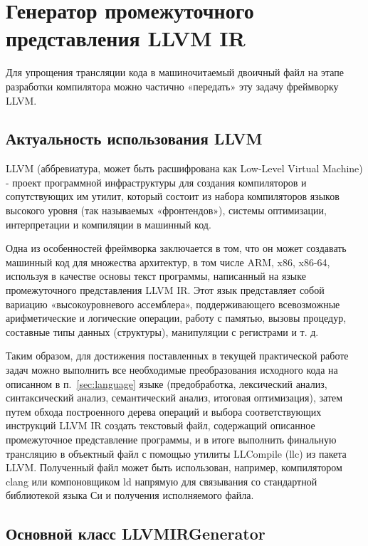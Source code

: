 \newpage
\section{Генератор промежуточного представления LLVM IR}
\label{sec:llvmir_codegen}

Для упрощения трансляции кода в машиночитаемый двоичный файл на этапе разработки компилятора можно частично «передать» эту задачу фреймворку LLVM.

\subsection{Актуальность использования LLVM}

LLVM (аббревиатура, может быть расшифрована как Low-Level Virtual Machine) - проект программной инфраструктуры для создания компиляторов и сопутствующих им утилит, который состоит из набора компиляторов языков высокого уровня (так называемых «фронтендов»), системы оптимизации, интерпретации и компиляции в машинный код.

Одна из особенностей фреймворка заключается в том, что он может создавать машинный код для множества архитектур, в том числе ARM, x86, x86-64, используя в качестве основы текст программы, написанный на языке промежуточного представления LLVM IR.
Этот язык представляет собой вариацию «высокоуровневого ассемблера», поддерживающего всевозможные арифметические и логические операции, работу с памятью, вызовы процедур, составные типы данных (структуры), манипуляции с регистрами и т. д.

Таким образом, для достижения поставленных в текущей практической работе задач можно выполнить все необходимые преобразования исходного кода на описанном в п.~\ref{sec:language} языке (предобработка, лексический анализ, синтаксический анализ, семантический анализ, итоговая оптимизация), затем путем обхода построенного дерева операций и выбора соответствующих инструкций LLVM IR создать текстовый файл, содержащий описанное промежуточное представление программы, и в итоге выполнить финальную трансляцию в объектный файл с помощью утилиты LLCompile (llc) из пакета LLVM.
Полученный файл может быть использован, например, компилятором clang или компоновщиком ld напрямую для связывания со стандартной библиотекой языка Си и получения исполняемого файла.
\cite{llvm_docs}

\subsection{Основной класс LLVMIRGenerator}

